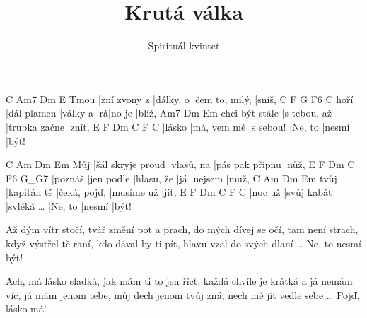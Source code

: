 \documentclass{song}
\title{Krutá válka}
\author{Spirituál kvintet}
\begin{document}
\strophe
     C            Am7       Dm             E
Tmou |zní zvony z |dálky, o |čem to, milý, |sníš,
     C           F        G  F6     C
hoří |dál plamen |války a |rá|no je |blíž,
               Am7          Dm            Em
chci být stále |s tebou, až |trubka začne |znít,
E      F           Dm        C       F      C
|lásko |má, vem mě |s sebou! |Ne, to |nesmí |být!
\endstrophe

\strophe
    C                 Am         Dm              Em
Můj |šál skryje proud |vlasů, na |pás pak připnu |nůž,
E       F          Dm         C   F6      G_G7
|poznáš |jen podle |hlasu, že |já |nejsem |muž,
     C           Am           Dm         Em
tvůj |kapitán tě |čeká, pojď, |musíme už |jít,
E       F           Dm               C       F      C
|noc už |svůj kabát |svléká \ldots{} |Ne, to |nesmí |být!
\endstrophe

\strophe*
Až dým vítr stočí, tvář změní pot a prach,
do mých dívej se očí, tam není strach,
když výstřel tě raní, kdo dával by ti pít,
hlavu vzal do svých dlaní \ldots{} Ne, to nesmí být!
\endstrophe

\strophe*
Ach, má lásko sladká, jak mám ti to jen říct,
každá chvíle je krátká a já nemám víc,
já mám jenom tebe, můj dech jenom tvůj zná,
nech mě jít vedle sebe \ldots{} Pojď, lásko má!
\endstrophe
\end{document}
